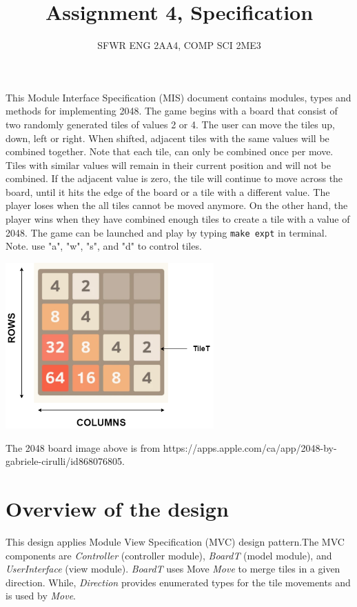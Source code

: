 \documentclass[12pt]{article}
\title{Assignment 4, Specification}
\author{SFWR ENG 2AA4, COMP SCI 2ME3}
\begin{document}
\maketitle
This Module Interface Specification (MIS) document contains modules, types and methods for implementing 2048. The game begins with a board that consist of two randomly generated tiles of values 2 or 4. The user can move the tiles up, down, left or right. When shifted, adjacent tiles with the same values will be combined together. Note that each tile, can only be combined once per move. Tiles with similar values will remain in their current position and will not be combined. If the adjacent value is zero, the tile will continue to move across the board, until it hits the edge of the board or a tile with a different value. The player loses when the  all tiles cannot be moved anymore. On the other hand, the player wins when they have combined enough tiles to create a tile with a value of 2048. The game can be launched and play by typing \verb|make expt| in terminal. Note. use "a", "w", "s", and "d" to control tiles.

\begin{center}
  \includegraphics[width=0.6\textwidth]{2048_board_labelled.png}

  The 2048 board image above is from https://apps.apple.com/ca/app/2048-by-gabriele-cirulli/id868076805.
\end{center}

\newpage

\section{Overview of the design}

This design applies Module View Specification (MVC) design pattern.The MVC components are \textit{Controller} (controller module), \textit{BoardT} (model module), and \textit{UserInterface} (view module). \textit{BoardT} uses Move \textit{Move} to merge tiles in a given direction. While, \textit{Direction} provides enumerated types for the tile movements and is used by \textit{Move}.
\end{document}
